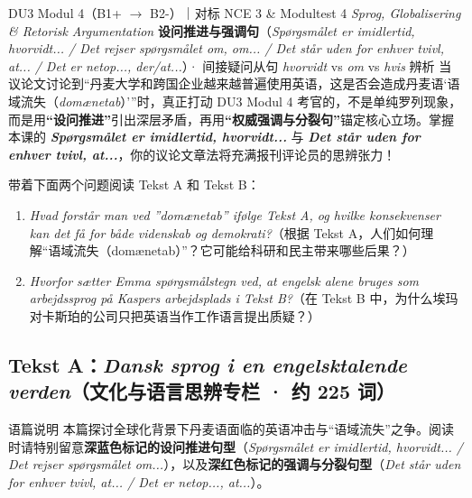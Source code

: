 {DU3 Modul 4（B1+ $\rightarrow$ B2-）｜对标 NCE 3 \& Modultest 4 \textit{Sprog, Globalisering \& Retorisk Argumentation}}
{\textbf{设问推进与强调句}（\textit{Spørgsmålet er imidlertid, hvorvidt... / Det rejser spørgsmålet om, om... / Det står uden for enhver tvivl, at... / Det er netop..., der/at...}）· 间接疑问从句 \textit{hvorvidt} vs \textit{om} vs \textit{hvis} 辨析}
{当议论文讨论到“丹麦大学和跨国企业越来越普遍使用英语，这是否会造成丹麦语‘语域流失（\textit{domænetab}）’”时，真正打动 DU3 Modul 4 考官的，不是单纯罗列现象，而是用\textbf{“设问推进”}引出深层矛盾，再用\textbf{“权威强调与分裂句”}锚定核心立场。掌握本课的 \textbf{\textit{Spørgsmålet er imidlertid, hvorvidt...}} 与 \textbf{\textit{Det står uden for enhver tvivl, at...}}，你的议论文章法将充满报刊评论员的思辨张力！}

\begin{foerduleaeser}
带着下面两个问题阅读 Tekst A 和 Tekst B：
\begin{enumerate}
  \item \textit{Hvad forstår man ved ”domænetab” ifølge Tekst A, og hvilke konsekvenser kan det få for både videnskab og demokrati?}（根据 Tekst A，人们如何理解“语域流失（domænetab）”？它可能给科研和民主带来哪些后果？）
  \item \textit{Hvorfor sætter Emma spørgsmålstegn ved, at engelsk alene bruges som arbejdssprog på Kaspers arbejdsplads i Tekst B?}（在 Tekst B 中，为什么埃玛对卡斯珀的公司只把英语当作工作语言提出质疑？）
\end{enumerate}
\end{foerduleaeser}


\subsection*{Tekst A：\textit{Dansk sprog i en engelsktalende verden}（文化与语言思辨专栏 · 约 225 词）}

\begin{tipbox}{语篇说明}
本篇探讨全球化背景下丹麦语面临的英语冲击与“语域流失”之争。阅读时请特别留意\textbf{\color{NCDNavy}深蓝色标记的设问推进句型}（\textit{Spørgsmålet er imidlertid, hvorvidt... / Det rejser spørgsmålet om...}），以及\textbf{\color{NCDRed}深红色标记的强调与分裂句型}（\textit{Det står uden for enhver tvivl, at... / Det er netop..., at...}）。
\end{tipbox}


